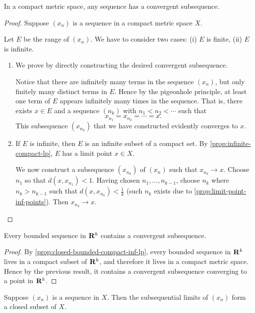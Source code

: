 \begin{proposition}
In a compact metric space, any sequence has a convergent subsequence.
\end{proposition}

\begin{proof}
Suppose $(x_n)$ is a sequence in a compact metric space $X$.

Let $E$ be the range of $(x_n)$. We have to consider two cases: (i) $E$ is finite, (ii) $E$ is infinite.
\begin{enumerate}[label=(\roman*)]
\item We prove by directly constructing the desired convergent subsequence.

Notice that there are infinitely many terms in the sequence $(x_n)$, but only finitely many distinct terms in $E$. Hence by the pigeonhole principle, at least one term of $E$ appears infinitely many times in the sequence. That is, there exists $x\in E$ and a sequence $(n_k)$ with $n_1<n_2<\cdots$ such that
\[x_{n_1}=x_{n_2}=\cdots=x.\]
This subsequence $(x_{n_k})$ that we have constructed evidently converges to $x$.

\item If $E$ is infinite, then $E$ is an infinite subset of a compact set. By \cref{prop:infinite-compact-lp}, $E$ has a limit point $x\in X$.

We now construct a subsequence $(x_{n_k})$ of $(x_n)$ such that $x_{n_k}\to x$. Choose $n_1$ so that $d(x,x_{n_1})<1$. Having chosen $n_1,\dots,n_{k-1}$, choose $n_k$ where $n_k>n_{k-1}$ such that $d(x,x_{n_k})<\frac{1}{k}$ (such $n_k$ exists due to \cref{prop:limit-point-inf-points}). Then $x_{n_k}\to x$.
\end{enumerate}
\end{proof}

\begin{corollary}
Every bounded sequence in $\mathbf R^k$ contains a convergent subsequence.
\end{corollary}

\begin{proof}
By \cref{prop:closed-bounded-compact-inf-lp}, every bounded sequence in $\mathbf R^k$ lives in a compact subset of $\mathbf R^k$, and therefore it lives in a compact metric space. Hence by the previous result, it contains a convergent subsequence converging to a point in $\mathbf R^k$.
\end{proof}

\begin{lemma}
Suppose $(x_n)$ is a sequence in $X$. Then the subsequential limits of $(x_n)$ form a closed subset of $X$.
\end{lemma}

